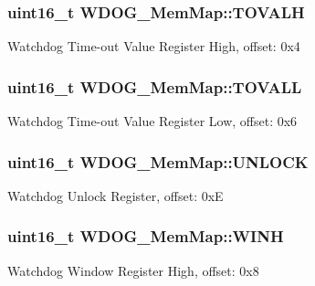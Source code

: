 \subsubsection[{T\+O\+V\+A\+L\+H}]{\setlength{\rightskip}{0pt plus 5cm}uint16\+\_\+t W\+D\+O\+G\+\_\+\+Mem\+Map\+::\+T\+O\+V\+A\+L\+H}\label{struct_w_d_o_g___mem_map_ae5ac6a42d85914d2f739b5377734f87a}
Watchdog Time-\/out Value Register High, offset\+: 0x4 \hypertarget{struct_w_d_o_g___mem_map_a2ce5a77ef35f55b7f60a11757dbd758f}{}
\subsubsection[{T\+O\+V\+A\+L\+L}]{\setlength{\rightskip}{0pt plus 5cm}uint16\+\_\+t W\+D\+O\+G\+\_\+\+Mem\+Map\+::\+T\+O\+V\+A\+L\+L}\label{struct_w_d_o_g___mem_map_a2ce5a77ef35f55b7f60a11757dbd758f}
Watchdog Time-\/out Value Register Low, offset\+: 0x6 \hypertarget{struct_w_d_o_g___mem_map_a78988c0aeb0693a231757a4cc164e1bf}{}
\subsubsection[{U\+N\+L\+O\+C\+K}]{\setlength{\rightskip}{0pt plus 5cm}uint16\+\_\+t W\+D\+O\+G\+\_\+\+Mem\+Map\+::\+U\+N\+L\+O\+C\+K}\label{struct_w_d_o_g___mem_map_a78988c0aeb0693a231757a4cc164e1bf}
Watchdog Unlock Register, offset\+: 0x\+E \hypertarget{struct_w_d_o_g___mem_map_a86589dc11cb4b7d3a00be9234372591f}{}
\subsubsection[{W\+I\+N\+H}]{\setlength{\rightskip}{0pt plus 5cm}uint16\+\_\+t W\+D\+O\+G\+\_\+\+Mem\+Map\+::\+W\+I\+N\+H}\label{struct_w_d_o_g___mem_map_a86589dc11cb4b7d3a00be9234372591f}
Watchdog Window Register High, offset\+: 0x8 \hypertarget{struct_w_d_o_g___mem_map_af238938251c1f5904a215c8a4ed1b74d}{}

